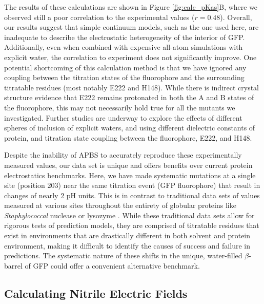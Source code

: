 The results of these calculations are shown in Figure \ref{fig:calc_pKas}B, where we observed still a poor correlation to the experimental values ($r = 0.48$).
Overall, our results suggest that simple continuum models, such as the one used here, are inadequate to describe the electrostatic heterogeneity of the interior of GFP.
Additionally, even when combined with expensive all-atom simulations with explicit water, the correlation to experiment does not significantly improve.
One potential shortcoming of this calculation method is that we have ignored any coupling between the titration states of the fluorophore and the surrounding titratable residues (most notably E222 and H148).
While there is indirect crystal structure evidence\cite{Elsliger1999} that E222 remains protonated in both the A and B states of the fluorophore, this may not necessarily hold true for all the mutants we investigated.
Further studies are underway to explore the effects of different spheres of inclusion of explicit waters,  and using different dielectric constants of protein, and titration state coupling between the fluorophore, E222, and H148.

Despite the inability of APBS to accurately reproduce these experimentally measured \pKa{} values, our data set is unique and offers benefits over current protein electrostatics benchmarks.
Here, we have made systematic mutations at a single site (position 203) near the same titration event (GFP fluorophore) that result in \pKa{} changes of nearly 2 pH units.
This is in contrast to traditional data sets of \pKa{} values measured at various sites throughout the entirety of globular proteins like \emph{Staphylococcal} nuclease or lysozyme \cite{Nielsen2011, Castaneda2009, Merz1991}.
While these traditional data sets allow for rigorous tests of \pKa{} prediction models, they are comprised of titratable residues that exist in environments that are drastically different in both solvent and protein environment, making it difficult to identify the causes of success and failure in \pKa{} predictions.
The systematic nature of these \pKa{} shifts in the unique, water-filled $\beta$-barrel of GFP could offer a convenient alternative benchmark. 

\subsection{Calculating Nitrile Electric Fields}

